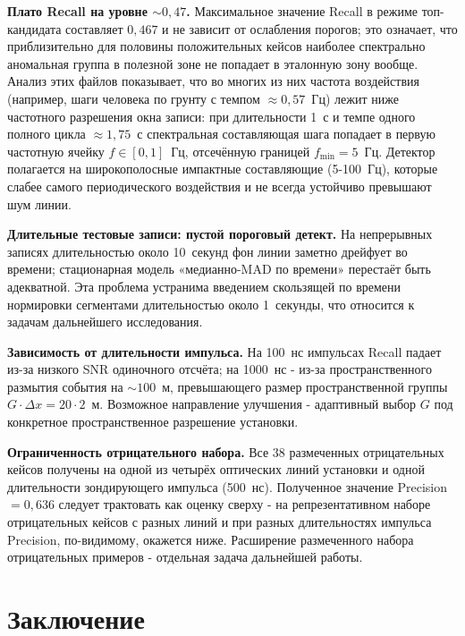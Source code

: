 \documentclass[12pt,a4paper]{extarticle}
\begin{document}
\textbf{Плато Recall на уровне $\sim 0{,}47$.} Максимальное значение Recall в режиме топ-кандидата составляет $0{,}467$ и не зависит от ослабления порогов; это означает, что приблизительно для половины положительных кейсов наиболее спектрально аномальная группа в полезной зоне не попадает в эталонную зону вообще. Анализ этих файлов показывает, что во многих из них частота воздействия (например, шаги человека по грунту с темпом $\approx 0{,}57$~Гц) лежит ниже частотного разрешения окна записи: при длительности 1~с и темпе одного полного цикла $\approx 1{,}75$~с спектральная составляющая шага попадает в первую частотную ячейку $f \in [0, 1]$~Гц, отсечённую границей $f_\text{min} = 5$~Гц. Детектор полагается на широкополосные импактные составляющие (5-100~Гц), которые слабее самого периодического воздействия и не всегда устойчиво превышают шум линии.

\textbf{Длительные тестовые записи: пустой пороговый детект.} На непрерывных записях длительностью около 10~секунд фон линии заметно дрейфует во времени; стационарная модель «медианно-MAD по времени» перестаёт быть адекватной. Эта проблема устранима введением скользящей по времени нормировки сегментами длительностью около 1~секунды, что относится к задачам дальнейшего исследования.

\textbf{Зависимость от длительности импульса.} На 100~нс импульсах Recall падает из-за низкого SNR одиночного отсчёта; на 1000~нс - из-за пространственного размытия события на $\sim 100$~м, превышающего размер пространственной группы $G \cdot \Delta x = 20 \cdot 2$~м. Возможное направление улучшения - адаптивный выбор $G$ под конкретное пространственное разрешение установки.

\textbf{Ограниченность отрицательного набора.} Все 38 размеченных отрицательных кейсов получены на одной из четырёх оптических линий установки и одной длительности зондирующего импульса (500~нс). Полученное значение Precision $= 0{,}636$ следует трактовать как оценку сверху - на репрезентативном наборе отрицательных кейсов с разных линий и при разных длительностях импульса Precision, по-видимому, окажется ниже. Расширение размеченного набора отрицательных примеров - отдельная задача дальнейшей работы.

\newpage

\section{Заключение}
\end{document}
